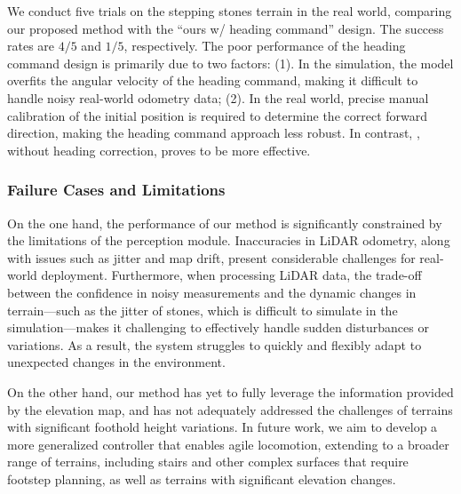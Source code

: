 We conduct five trials on the stepping stones terrain in the real world, comparing our proposed method with the ``ours w/ heading command'' design. The success rates are $4/5$ and $1/5$, respectively. The poor performance of the heading command design is primarily due to two factors: (1). In the simulation, the model overfits the angular velocity of the heading command, making it difficult to handle noisy real-world odometry data; (2). In the real world, precise manual calibration of the initial position is required to determine the correct forward direction, making the heading command approach less robust. In contrast, \beamdojo, without heading correction, proves to be more effective.

\subsubsection{Failure Cases and Limitations}

On the one hand, the performance of our method is significantly constrained by the limitations of the perception module. Inaccuracies in LiDAR odometry, along with issues such as jitter and map drift, present considerable challenges for real-world deployment. Furthermore, when processing LiDAR data, the trade-off between the confidence in noisy measurements and the dynamic changes in terrain—such as the jitter of stones, which is difficult to simulate in the simulation—makes it challenging to effectively handle sudden disturbances or variations. As a result, the system struggles to quickly and flexibly adapt to unexpected changes in the environment.

On the other hand, our method has yet to fully leverage the information provided by the elevation map, and has not adequately addressed the challenges of terrains with significant foothold height variations. In future work, we aim to develop a more generalized controller that enables agile locomotion, extending to a broader range of terrains, including stairs and other complex surfaces that require footstep planning, as well as terrains with significant elevation changes.